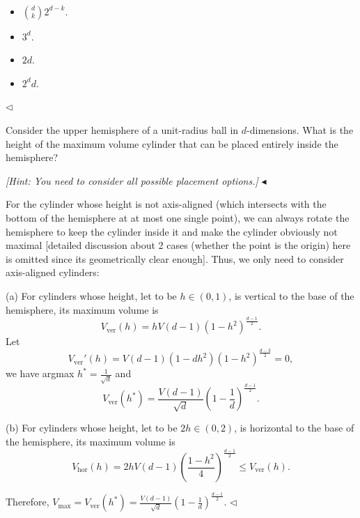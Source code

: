 ﻿\documentclass[11pt]{article}
\newenvironment{problem}[2][Problem]{\begin{trivlist}
\item[\hskip \labelsep {\bfseries #1}\hskip \labelsep {\bfseries #2.}]}{\hfill$\blacktriangleleft$\end{trivlist}}
\newenvironment{answer}[1][Answer]{\begin{trivlist}
\item[\hskip \labelsep {\bfseries #1.}\hskip \labelsep]}{\hfill$\lhd$\end{trivlist}}
\begin{document}
\begin{answer} ~
\begin{itemize}
    \item [(1)] $\binom{d}{k}2^{d-k}$.
    \item [(2)] $3^d$.
    \item [(3)] $2d$.
    \item [(4)] $2^dd$.
\end{itemize}
\end{answer}



\begin{problem}{7 (16')}
Consider the upper hemisphere of a unit-radius ball in $d$-dimensions. What is the height of the maximum volume cylinder that can be placed entirely inside the hemisphere?

\textit{[Hint: You need to consider all possible placement options.]}
\end{problem}

\begin{answer}
    For the cylinder whose height is not axis-aligned (which intersects with the bottom of the hemisphere at at most one single point), we can always rotate the hemisphere to keep the cylinder inside it and make the cylinder obviously not maximal [detailed discussion about 2 cases (whether the point is the origin) here is omitted since its geometrically clear enough]. Thus, we only need to consider axis-aligned cylinders:

    (a) For cylinders whose height, let to be $h\in(0,1)$, is vertical to the base of the hemisphere, its maximum volume is
    $$
        V_{\text{ver}}(h) = hV(d-1)(1-h^2)^{\frac{d-1}{2}}.
    $$
    Let
    $$
        V_{\text{ver}}'(h) = V(d-1)(1-dh^2)(1-h^2)^{\frac{d-3}{2}} = 0,
    $$
    we have argmax $h^*=\frac{1}{\sqrt{d}}$ and
    $$
        V_{\text{ver}}(h^*) = \frac{V(d-1)}{\sqrt{d}}\left(1-\frac{1}{d}\right)^{\frac{d-1}{2}}.
    $$

    (b) For cylinders whose height, let to be $2h\in(0,2)$, is horizontal to the base of the hemisphere, its maximum volume is
    $$
        V_{\text{hor}}(h) = 2hV(d-1)\left(\frac{1-h^2}{4}\right)^{\frac{d-1}{2}} \le V_{\text{ver}}(h).
    $$

    Therefore, $V_{\max}=V_{\text{ver}}(h^*)=\frac{V(d-1)}{\sqrt{d}}\left(1-\frac{1}{d}\right)^{\frac{d-1}{2}}$.
\end{answer}
\end{document}
